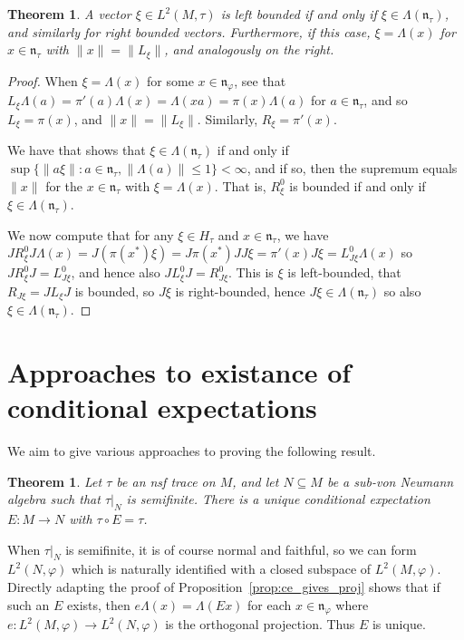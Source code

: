 \documentclass[a4paper,11pt]{article}
\newcommand{\mf}[1]{{\mathfrak{#1}}}
\newtheorem{theorem}[lemma]{Theorem}
\theoremstyle{definition}
\begin{document}
\begin{theorem}\label{thm:bounded_vectors}
A vector $\xi\in L^2(M,\tau)$ is left bounded if and only if $\xi \in \Lambda(\mf n_\tau)$, and similarly for right bounded vectors.  Furthermore, if this case, $\xi=\Lambda(x)$ for $x\in\mf n_\tau$ with $\|x\| = \|L_\xi\|$, and analogously on the right.
\end{theorem}
\begin{proof}
When $\xi=\Lambda(x)$ for some $x\in\mf n_\varphi$, see that $L_\xi\Lambda(a) = \pi'(a)\Lambda(x) = \Lambda(xa) = \pi(x)\Lambda(a)$ for $a\in\mf n_\tau$, and so $L_\xi = \pi(x)$, and $\|x\| = \|L_\xi\|$.  Similarly, $R_\xi = \pi'(x)$.

We have that \cite[Chapter~V, Lemma~2.21]{TakesakiI} shows that $\xi\in\Lambda(\mf n_\tau)$ if and only if $\sup\{ \|a\xi\| : a\in\mf n_\tau, \|\Lambda(a)\|\leq 1\} < \infty$, and if so, then the supremum equals $\|x\|$ for the $x\in\mf n_\tau$ with $\xi=\Lambda(x)$.  That is, $R^0_\xi$ is bounded if and only if $\xi\in\Lambda(\mf n_\tau)$.

We now compute that for any $\xi\in H_\tau$ and $x\in\mf n_\tau$, we have $JR^0_\xi J\Lambda(x) = J(\pi(x^*)\xi) = J\pi(x^*)J J\xi = \pi'(x) J\xi = L^0_{J\xi}\Lambda(x)$ so $JR^0_\xi J = L^0_{J\xi}$, and hence also $JL^0_\xi J = R^0_{J\xi}$.  This is $\xi$ is left-bounded, that $R_{J\xi} = JL_\xi J$ is bounded, so $J\xi$ is right-bounded, hence $J\xi \in \Lambda(\mf n_\tau)$ so also $\xi\in\Lambda(\mf n_\tau)$.
\end{proof}


\section{Approaches to existance of conditional expectations}

We aim to give various approaches to proving the following result.

\begin{theorem}\label{thm:main}
Let $\tau$ be an nsf trace on $M$, and let $N\subseteq M$ be a sub-von Neumann algebra such that $\tau|_N$ is semifinite.  There is a unique conditional expectation $E\colon M\to N$ with $\tau \circ E = \tau$.
\end{theorem}

When $\tau|_N$ is semifinite, it is of course normal and faithful, so we can form $L^2(N,\varphi)$ which is naturally identified with a closed subspace of $L^2(M,\varphi)$.  Directly adapting the proof of Proposition~\ref{prop:ce_gives_proj} shows that if such an $E$ exists, then $e \Lambda(x) = \Lambda(Ex)$ for each $x\in\mf n_\varphi$ where $e \colon L^2(M,\varphi) \to L^2(N,\varphi)$ is the orthogonal projection.  Thus $E$ is unique.
\end{document}
